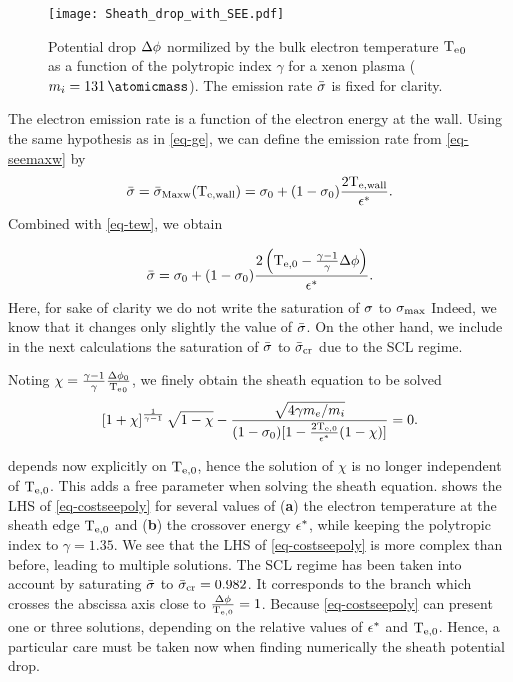 \begin{figure}[!hbt]
  \centering
  \texttt{[image: Sheath\_drop\_with\_SEE.pdf]}
  \caption{Potential drop $\Delta \phi$ normilized by the bulk electron temperature $\mathrm{T_e}_0$ as a function of the polytropic index $\gamma$ for a xenon plasma ($m_i = 131\,\atomicmass$). The emission rate $ \bar{\sigma }$ is fixed for clarity.}
  \label{fig-dphi_see}
\end{figure}

The electron emission rate is a function of the electron energy at the wall.
Using the same hypothesis as in \cref{eq-ge}, we can define the emission rate from \cref{eq-seemaxw} by
\begin{equation} \label{eq-seemaxw_poly}
   \bar{\sigma } =  \bar{\sigma }_{\rm Maxw}(\mathrm{T_{e, wall}}) = \sigma_0 + ( 1 - \sigma_0) \frac{ 2 \mathrm{T_{e, wall}}  }{\epsilon^{*}}.
\end{equation}
Combined with \cref{eq-tew}, we obtain

\begin{equation} \label{eq-seemaxw_Tew}
   \bar{\sigma } = \sigma_0 + ( 1 - \sigma_0) \frac{ 2 \left( \mathrm{T_{e, 0}} - \frac{\gamma - 1}{\gamma} \Delta \phi \right) }{\epsilon^{*}}.
\end{equation}
Here, for sake of clarity we do not write the saturation of $\sigma $ to $\sigma_{\rm max}$
Indeed, we know that it  changes only slightly the value of $ \bar{\sigma }$.
On the other hand, we include in the next calculations the saturation of $ \bar{\sigma }$ to $ \bar{\sigma }_{\rm cr}$ due to the \ac{SCL} regime.

Noting $\chi = \frac{\gamma -1}{\gamma} \frac{ \Delta \phi_0}{ \mathrm{T_e}_0} $, we finely obtain the sheath equation to be solved
\begin{equation} \label{eq-costseepoly}
  \left[ 1 + \chi  \right]^{\frac{1}{\gamma - 1}} \sqrt{1 - \chi} - \frac{  \sqrt{4 \gamma m_e / m_i}}{  (1 - \sigma_0) [1 - \frac{2 \mathrm{T_{e, 0}}}{\epsilon^{*}} (1 - \chi ) ] } = 0.
\end{equation}

 depends now explicitly on $\mathrm{T_{e, 0}}$, hence the solution of $\chi$ is no longer independent of $\mathrm{T_{e, 0}}$.
This adds a free parameter when solving the sheath equation.
 shows the \ac{LHS} of \cref{eq-costseepoly} for several values of ({\bf a})  the electron temperature at the sheath edge  $\mathrm{T_{e, 0}}$ and ({\bf b}) the crossover energy $\epsilon^{*}$, while keeping the polytropic index to $\gamma=1.35$.
We see that the \ac{LHS} of \cref{eq-costseepoly} is more complex than before, leading to multiple solutions.
The \ac{SCL} regime has been taken into account by saturating $ \bar{\sigma }$ to $ \bar{\sigma }_{\rm cr}=0.982$. 
It corresponds to the branch which crosses the abscissa axis close to $\frac{\Delta \phi}{\mathrm{T_{e, 0}}}=1$. 
Because \cref{eq-costseepoly} can present one or three solutions, depending on the relative values of $\epsilon^{*}$ and $\mathrm{T_{e, 0}}$.
Hence, a particular care must be taken now when finding numerically the sheath potential drop.

